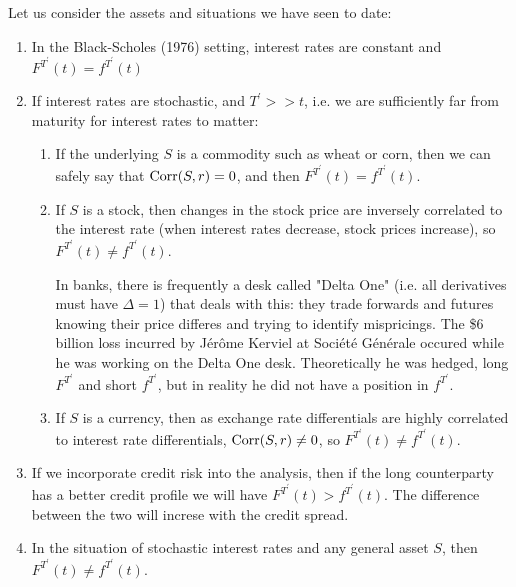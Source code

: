 \documentclass[11pt]{article}
\begin{document}
Let us consider the assets and situations we have seen to date:
\begin{enumerate}
\item In the Black-Scholes (1976) setting, interest rates are constant and $F^{T^\prime}(t) = f^{T^\prime}(t)$
\item If interest rates are stochastic, and $T^\prime >> t$, i.e. we are sufficiently far from maturity for interest rates to matter:
\begin{enumerate}
\item If the underlying $S$ is a commodity such as wheat or corn, then we can safely say that $\operatorname{\mathrm Corr}(S, r) = 0$, and then $F^{T^\prime}(t) = f^{T^\prime}(t)$.
\item If $S$ is a stock, then changes in the stock price are inversely correlated to the interest rate (when interest rates decrease, stock prices increase), so $F^{T^\prime}(t) \neq f^{T^\prime}(t)$.

\begin{remark}
In banks, there is frequently a desk called "Delta One" (i.e. all derivatives must have $\Delta=1$) that deals with this: they trade forwards and futures knowing their price differes and trying to identify mispricings. The \$6 billion loss incurred by Jérôme Kerviel at Société Générale occured while he was working on the Delta One desk. Theoretically he was hedged, long $F^{T^\prime}$ and short $f^{T^\prime}$, but in reality he did not have a position in $f^{T^\prime}$.
\end{remark}

\item If $S$ is a currency, then as exchange rate differentials are highly correlated to interest rate differentials, $\operatorname{\mathrm Corr}(S, r) \neq 0$, so $F^{T^\prime}(t) \neq f^{T^\prime}(t)$.
\end{enumerate}
\item If we incorporate credit risk into the analysis, then if the long counterparty has a better credit profile we will have $F^{T^\prime}(t) > f^{T^\prime}(t)$. The difference between the two will increse with the credit spread.
\item In the situation of stochastic interest rates and any general asset $S$, then $F^{T^\prime}(t) \neq f^{T^\prime}(t)$.
\end{enumerate}
\end{document}
